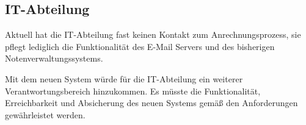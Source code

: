 \subsection{IT-Abteilung}

Aktuell hat die IT-Abteilung fast keinen Kontakt zum Anrechnungsprozess, sie pflegt lediglich die Funktionalität des E-Mail Servers und des bisherigen Notenverwaltungssystems.

Mit dem neuen System würde für die IT-Abteilung ein weiterer Verantwortungsbereich hinzukommen. Es müsste die Funktionalität, Erreichbarkeit und Absicherung des neuen Systems gemäß den Anforderungen gewährleistet werden.